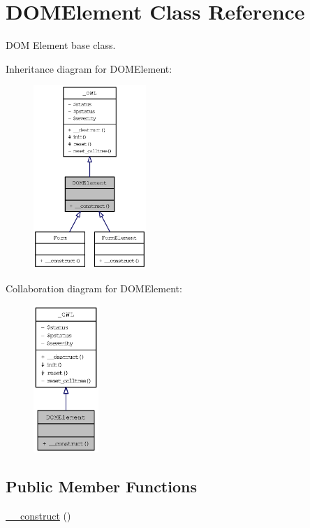 \hypertarget{classDOMElement}{
\section{DOMElement Class Reference}
\label{classDOMElement}
}
DOM Element base class.  


Inheritance diagram for DOMElement:\nopagebreak
\begin{figure}[H]
\begin{center}
\leavevmode
\includegraphics[width=121pt]{classDOMElement__inherit__graph}
\end{center}
\end{figure}
Collaboration diagram for DOMElement:\nopagebreak
\begin{figure}[H]
\begin{center}
\leavevmode
\includegraphics[width=70pt]{classDOMElement__coll__graph}
\end{center}
\end{figure}
\subsection*{Public Member Functions}
\begin{CompactItemize}
\item 
\hyperlink{classDOMElement_309ad8e22a59ba874187929c4c851be3}{\_\-\_\-construct} ()
\end{CompactItemize}
